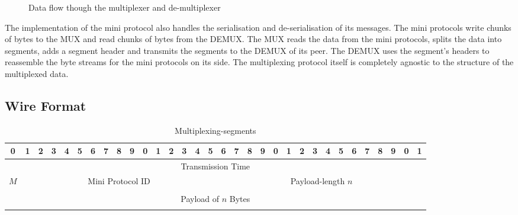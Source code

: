 \documentclass{report}
\newcommand{\hsref}[1]{}
\newcommand{\hsref}[1]
                    {\href{https://github.com/input-output-hk/ouroboros-network/blob/master/#1}
                      {\emph{Haskell source: #1}}}
\theoremstyle{definition}{
  \newtheorem{lemma}{Lemma}[section] %
  \newtheorem{definition}[lemma]{Definition}
}
\theoremstyle{theorem}{
  \newtheorem{invariant}[lemma]{Invariant}
  \newtheorem{proofobligation}[lemma]{Proof Obligation}
}
\numberwithin{equation}{lemma}
\begin{document}
\begin{figure}[ht]
\begin{center}
\end{center}
\caption{Data flow though the multiplexer and de-multiplexer}
\label{mux-diagram}
\end{figure}

The implementation of the mini protocol also handles the serialisation and de-serialisation of its messages.
The mini protocols write chunks of bytes to the MUX and read chunks of bytes from the DEMUX.
The MUX reads the data from the mini protocols, splits the data into segments, adds a segment header
and transmits the segments to the DEMUX of its peer.
The DEMUX uses the segment's headers to reassemble the byte streams for the mini protocols on its side.
The multiplexing protocol itself is completely agnostic to the structure of the multiplexed data.

\subsection{Wire Format}
\hsref{ouroboros-network/src/Ouroboros/Network/Mux/Egress.hs}
\begin{table}[h]
\centering
\begingroup
\setlength{\tabcolsep}{3pt}
\begin{tabular}{|c|c|c|c|c|c|c|c|c|c|c|c|c|c|c|c|c|c|c|c|c|c|c|c|c|c|c|c|c|c|c|c|}
  \hline
  0&1&2&3&4&5&6&7&8&9&0&1&2&3&4&5&6&7&8&9&0&1&2&3&4&5&6&7&8&9&0&1 \\ \hline
  \multicolumn{32}{|c|}{Transmission Time} \\ \hline
  \multicolumn{1}{|c|}{$M$}
  &\multicolumn{15}{|c|}{Mini Protocol ID}
  &\multicolumn{16}{|c|}{Payload-length $n$} \\ \hline
  \multicolumn{32}{|c|}{} \\
  \multicolumn{32}{|c|}{Payload of $n$ Bytes} \\
  \multicolumn{32}{|c|}{} \\ \hline
\end{tabular}
\endgroup
\caption{Multiplexing-segments}
\label{segment-header}
\end{table}
\end{document}
